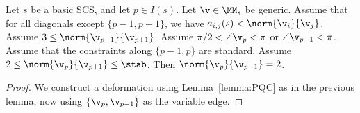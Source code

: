 \begin{lemma}[482 bis]\label{lemma:482-obtuse-bis}
Let $s$ be a basic SCS, and let $p\in I(s)$.  Let $\v\in \MM_s$ be generic.
Assume that for all diagonals except $\{p-1,p+1\}$,
we have $a_{i,j}(s)<\norm{\v_i}{\v_j}$.  
Assume $3 \le \norm{\v_{p-1}}{\v_{p+1}}$.
Assume $\pi/2 < \angle \v_p < \pi$ or $\angle \v_{p-1} < \pi$.
Assume that the constraints along $\{p-1,p\}$ are standard. 
Assume $2\le \norm{\v_p}{\v_{p+1}}\le \stab$.
Then $\norm{\v_p}{\v_{p-1}} = 2$.
\end{lemma}

\begin{proof}  We construct a deformation using Lemma~\ref{lemma:PQC} as in the previous lemma,
now using $\{\v_p,\v_{p-1}\}$ as the variable edge.
\end{proof}





